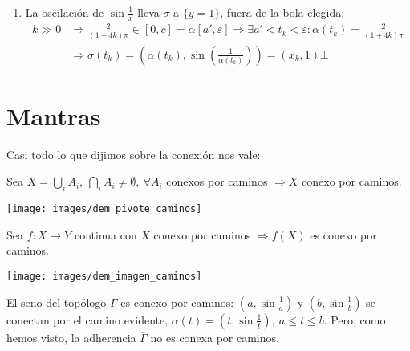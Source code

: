 \begin{ej}
\begin{enumerate}
\begin{demo}
\begin{enumerate}
            \item La oscilación de $\sin \frac{1}{x}$ lleva $\sigma$ a $\{y = 1\}$, fuera de la bola elegida:
            \begin{align*}
            k \gg 0 &\Rightarrow \frac{2}{\left( 1 + 4k \right) \pi} \in \left[ 0, c \right] = \alpha\left[ a', \varepsilon \right] \Rightarrow \exists a' < t_k < \varepsilon: \alpha\left( t_k \right) = \frac{2}{\left( 1 + 4k \right) \pi}\\ 
                &\Rightarrow \sigma\left( t_k \right) = \left( \alpha\left( t_k \right), \sin\left( \frac{1}{\alpha\left( t_k \right)} \right) \right) = \left( x_k, 1 \right) 
            \bot \end{align*}
        \end{enumerate}
    \end{demo}
\end{enumerate}
\end{ej}

\section{Mantras}%
\label{sec:mantras_conx_caminos}
Casi todo lo que dijimos sobre la conexión nos vale:
\begin{prop}
Sea $X = \bigcup_{i} A_i,\ \bigcap_{i} A_i \neq \emptyset,\ \forall A_i$ conexos por caminos $\Rightarrow X$ conexo por caminos. 
\end{prop}
\begin{demo}
\begin{center}
    \texttt{[image: images/dem\_pivote\_caminos]} 
\end{center}
\end{demo}

\begin{prop}
Sea $f: X \rightarrow Y$ continua con $X$ conexo por caminos $\Rightarrow f\left( X \right)$ es conexo por caminos. 
\end{prop}
\begin{demo}
\begin{center}
    \texttt{[image: images/dem\_imagen\_caminos]} 
\end{center}
\end{demo}

\begin{prop}
El seno del topólogo $\Gamma$ es conexo por caminos: $\left( a, \sin\frac{1}{a} \right)$ y $\left( b, \sin\frac{1}{b} \right)$ se conectan por el camino evidente, $\alpha\left( t \right) = \left( t, \sin\frac{1}{t} \right),\ a \le t \le b$. Pero, como hemos visto, la adherencia $\overline{\Gamma}$ no es conexa por caminos. 
\end{prop}

